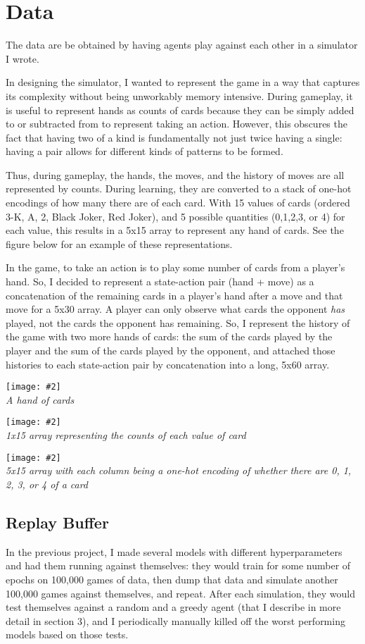 \documentclass{article}
\newcommand{\pic}[3]{
\begin{center}
\texttt{[image: \#2]}\\
\small\textit{#3}
\end{center}
}
\begin{document}
\section{Data}
The data are be obtained by having agents play against each other in a simulator I wrote.

In designing the simulator, I wanted to represent the game in a way that captures its complexity without being unworkably memory intensive. During gameplay, it is useful to represent hands as counts of cards because they can be simply added to or subtracted from to represent taking an action. However, this obscures the fact that having two of a kind is fundamentally not just twice having a single: having a pair allows for different kinds of patterns to be formed.

Thus, during gameplay, the hands, the moves, and the history of moves are all represented by counts. During learning, they are converted to a stack of one-hot encodings of how many there are of each card. With 15 values of cards (ordered 3-K, A, 2, Black Joker, Red Joker), and 5 possible quantities (0,1,2,3, or 4) for each value, this results in a 5x15 array to represent any hand of cards. See the figure below for an example of these representations.

In the game, to take an action is to play some number of cards from a player's hand. So, I decided to represent a state-action pair (hand + move) as a concatenation of the remaining cards in a player's hand after a move and that move for a 5x30 array. A player can only observe what cards the opponent \textit{has} played, not the cards the opponent has remaining. So, I represent the history of the game with two more hands of cards: the sum of the cards played by the player and the sum of the cards played by the opponent, and attached those histories to each state-action pair by concatenation into a long, 5x60 array.

\pic{.5}{h1.png}{A hand of cards}

\pic{.5}{h2.png}{1x15 array representing the counts of each value of card}

\pic{.5}{h3.png}{5x15 array with each column being a one-hot encoding of
whether there are 0, 1, 2, 3, or 4 of a card}


\subsection{Replay Buffer}

In the previous project, I made several models with different hyperparameters and had them running against themselves: they would train for some number of epochs on 100,000 games of data, then dump that data and simulate another 100,000 games against themselves, and repeat. After each simulation, they would test themselves against a random and a greedy agent (that I describe in more detail in section 3), and I periodically manually killed off the worst performing models based on those tests.
\end{document}

